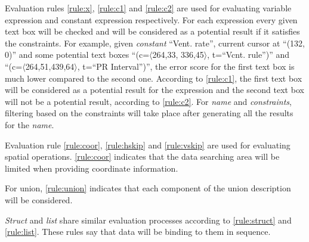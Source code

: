 Evaluation rules \ref{rule:x}, \ref{rule:c1} and \ref{rule:c2} are used 
for evaluating variable expression and constant expression respectively. 
For each expression every given text box will be checked and will be 
considered as a potential result if it satisfies the constraints. 
For example, given {\em constant} ``Vent. rate'', current cursor at ``(132, 0)'' and some potential text boxes ``(c=$\langle$264,33, 336,45$\rangle$, t=``Vcnt. rule'')'' and ``(c=$\langle$264,51,439,64$\rangle$, t=``PR Interval'')'', the error score for the first text box is much lower compared to the second one. According to \ref{rule:c1}, the first text box will be considered as a potential result 
for the expression and the second text box will not be a potential result, according to \ref{rule:c2}. For {\em name} and {\em constraints}, filtering based on the constraints will take place after generating all the results for the {\em name}. 

Evaluation rule \ref{rule:coor}, \ref{rule:hskip} and \ref{rule:vskip} 
are used for evaluating spatial operations. \ref{rule:coor} indicates that the data searching area 
will be limited when providing coordinate information. 

For union, \ref{rule:union} indicates that each component 
of the union description will be considered. 

{\em Struct} and {\em list} share 
similar evaluation processes according to \ref{rule:struct} and \ref{rule:list}. These rules say 
that data will be binding to them in sequence. 

